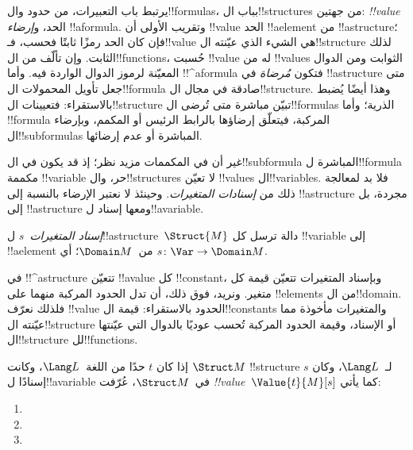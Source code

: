 \documentclass[../../../include/open-logic-section]{subfiles}
\begin{document}


\begin{explain}
يرتبط باب التعبيرات، من حدود وال!!{formula}s، بباب
ال!!{structure}s من جهتين: \emph{!!{value}} الحد، و\emph{إرضاء}
!!a{formula}. وتقريب الأولى أن !!{value} الحد !!a{element} من
!!a{structure}؛ فإن كان الحد رمزًا ثابتًا فحسب، فـ!!{value} هي الشيء
الذي عيّنته ال!!{structure} لذلك الثابت. وإن تألّف من
ال!!{function}s، حُسبت !!{value} له من !!{value}s الثوابت ومن
الدوال المعيّنة لرموز الدوال الواردة فيه. وأما !!^a{formula} فتكون
\emph{مُرضاة} في !!a{structure} متى جعل تأويل المحمولات
ال!!{formula} صادقة في مجال ال!!{structure}. وهذا أيضًا يُضبط
بالاستقراء: فتعيينات ال!!{structure} تبيّن مباشرة متى تُرضى
ال!!{formula}s الذرية؛ وأما !!{formula} المركبة، فيتعلّق إرضاؤها
بالرابط الرئيس أو المكمم، وبإرضاء ال!!{subformula}s المباشرة أو
عدم إرضائها.

غير أن في المكممات مزيد نظر؛ إذ قد يكون في ال!!{subformula}
المباشرة ل!!{formula} مكممة !!{variable} حر، وال!!{structure}s
لا تعيّن !!{value}s ال!!{variable}s. فلا بد لمعالجة ذلك من
\emph{إسنادات المتغيرات}. وحينئذ لا نعتبر الإرضاء بالنسبة إلى
!!a{structure} مجردة، بل إلى !!a{structure} ومعها إسناد
ل!!a{variable}.
\end{explain}

\begin{defn}
\emph{إسناد المتغيرات}~$s$ ل!!a{structure}~$\Struct{M}$ دالة ترسل
كل !!{variable} إلى !!a{element} من~$\Domain M$؛ أي
$s\colon \Var \to \Domain M$.
\end{defn}

\begin{explain}
في !!^a{structure} تتعيّن !!a{value} كل !!{constant}، وبإسناد
المتغيرات تتعيّن قيمة كل متغير. ونريد، فوق ذلك، أن تدل الحدود
المركبة منهما على !!{element}s من ال!!{domain}. فلذلك نعرّف
!!{value} الحدود بالاستقراء: قيمة ال!!{constant}s والمتغيرات
مأخوذة مما عيّنته ال!!{structure} أو الإسناد، وقيمة الحدود
المركبة تُحسب عوديًا بالدوال التي عيّنتها ال!!{structure}
لل!!{function}s.
\end{explain}

\begin{defn}
إذا كان $t$ حدًا من اللغة~$\Lang L$، وكانت $\Struct M$
!!{structure} لـ~$\Lang L$، وكان $s$ إسنادًا ل!!a{variable}
في~$\Struct M$، عُرّفت \emph{!!{value}}~$\Value{t}{M}[s]$ كما يأتي:
\begin{enumerate}
\item {}
\item {}
\item {}
\end{enumerate}
\end{defn}
\end{document}
